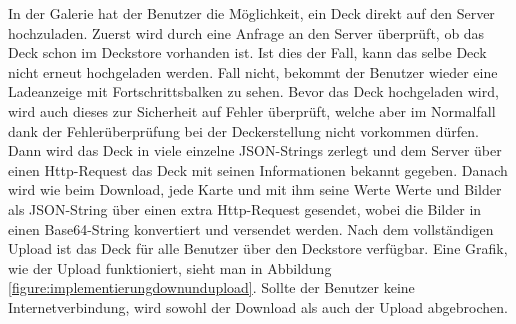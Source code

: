 In der Galerie hat der Benutzer die Möglichkeit, ein Deck direkt auf den Server hochzuladen. Zuerst wird durch eine Anfrage an den Server überprüft, ob das Deck schon im Deckstore vorhanden ist. Ist dies der Fall, kann das selbe Deck nicht erneut hochgeladen werden. Fall nicht, bekommt der Benutzer wieder eine Ladeanzeige mit Fortschrittsbalken zu sehen. Bevor das Deck hochgeladen wird, wird auch dieses zur Sicherheit auf Fehler überprüft, welche aber im Normalfall dank der Fehlerüberprüfung bei der Deckerstellung nicht vorkommen dürfen. Dann wird das Deck in viele einzelne JSON-Strings zerlegt und dem Server über einen Http-Request das Deck mit seinen Informationen bekannt gegeben. Danach wird wie beim Download, jede Karte und mit ihm seine Werte Werte und Bilder als JSON-String über einen extra Http-Request gesendet, wobei die Bilder in einen Base64-String konvertiert und versendet werden. Nach dem vollständigen Upload ist das Deck für alle Benutzer über den Deckstore verfügbar. Eine Grafik, wie der Upload funktioniert, sieht man in Abbildung \ref{figure:implementierungdownundupload}. Sollte der Benutzer keine Internetverbindung, wird sowohl der Download als auch der Upload abgebrochen.
\newpage

